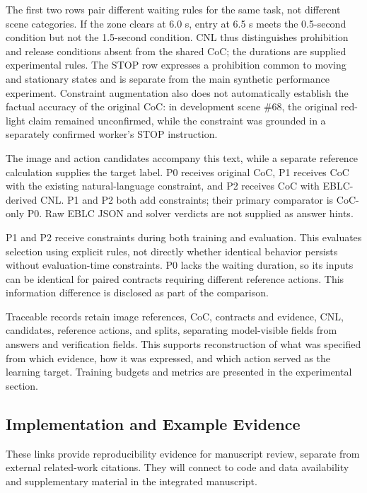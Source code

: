 \documentclass[11pt,a4paper]{article}
\begin{document}
The first two rows pair different waiting rules for the same task, not different scene categories. If the zone clears at 6.0 s, entry at 6.5 s meets the 0.5-second condition but not the 1.5-second condition. CNL thus distinguishes prohibition and release conditions absent from the shared CoC; the durations are supplied experimental rules. The STOP row expresses a prohibition common to moving and stationary states and is separate from the main synthetic performance experiment. Constraint augmentation also does not automatically establish the factual accuracy of the original CoC: in development scene \#68, the original red-light claim remained unconfirmed, while the constraint was grounded in a separately confirmed worker's STOP instruction.\par

The image and action candidates accompany this text, while a separate reference calculation supplies the target label. P0 receives original CoC, P1 receives CoC with the existing natural-language constraint, and P2 receives CoC with EBLC-derived CNL. P1 and P2 both add constraints; their primary comparator is CoC-only P0. Raw EBLC JSON and solver verdicts are not supplied as answer hints.\par

P1 and P2 receive constraints during both training and evaluation. This evaluates selection using explicit rules, not directly whether identical behavior persists without evaluation-time constraints. P0 lacks the waiting duration, so its inputs can be identical for paired contracts requiring different reference actions. This information difference is disclosed as part of the comparison.\par

Traceable records retain image references, CoC, contracts and evidence, CNL, candidates, reference actions, and splits, separating model-visible fields from answers and verification fields. This supports reconstruction of what was specified from which evidence, how it was expressed, and which action served as the learning target. Training budgets and metrics are presented in the experimental section.\par

\begingroup\small\setlength{\parskip}{3pt}
\subsection*{Implementation and Example Evidence}

These links provide reproducibility evidence for manuscript review, separate from external related-work citations. They will connect to code and data availability and supplementary material in the integrated manuscript.\par
\end{document}
